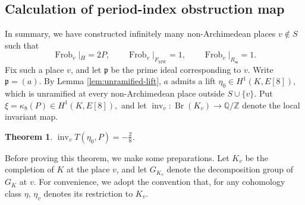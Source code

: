 \documentclass[11pt,a4paper]{amsart}
\newtheorem{theorem}{Theorem}[section]
\theoremstyle{definition}
\newcommand{\Br}{\operatorname{Br}}
\newcommand{\inv}{\operatorname{inv}}
\numberwithin{equation}{section}
\begin{document}
\subsection{Calculation of period-index obstruction map}
In summary, we have constructed infinitely many non-Archimedean places \(v\notin S\)
such that
\begin{equation}\label{eq:Frob-conditions}
	\operatorname{Frob}_v|_H=2P,
	\qquad
	\operatorname{Frob}_v|_{F_{\mathrm{MW}}}=1,
	\qquad
	\operatorname{Frob}_v|_{R_{\mathfrak m}}=1.
\end{equation}
Fix such a place \(v\), and let \(\mathfrak p\) be the prime ideal
corresponding to \(v\). Write \(\mathfrak p=(a)\). By Lemma
\ref{lem:unramified-lift}, \(a\) admits a lift $
\eta_0\in H^1(K,E[8]),$
which is unramified at every non-Archimedean place outside
\(S\cup\{v\}\). Put $\xi=\kappa_8(P)\in H^1(K,E[8]),$ and let $\inv_v: \Br(K_v)\rightarrow \mathbb{Q}/\mathbb{Z}$ denote the local invariant map.
 \begin{theorem}\label{cc}
 	$\inv_{v}T(\eta_0,P)=-\frac{2}{8}$.
 \end{theorem}
    
    Before proving this theorem, we make some preparations. Let
    $K_v$ be the completion of $K$ at the place $v$, and let
    $G_{K_{v}}$ denote the decomposition group of $G_K$ at
    $v$. For convenience, we adopt the convention that, for any cohomology class \(\eta\), \(\eta_{v}\) denotes its restriction to \(K_{v}\).
    
\end{document}
